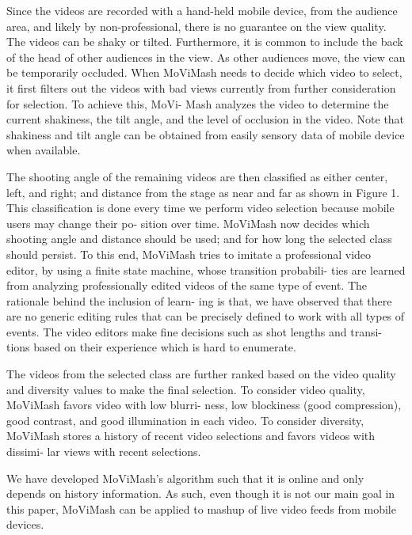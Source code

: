 \documentclass{new}
\begin{document}
Since the videos are recorded with a hand-held mobile device,
from the audience area, and likely by non-professional, there is no
guarantee on the view quality. The videos can be shaky or tilted.
Furthermore, it is common to include the back of the head of other
audiences in the view. As other audiences move, the view can be
temporarily occluded. When MoViMash needs to decide which
video to select, it first filters out the videos with bad views currently
from further consideration for selection. To achieve this, MoVi-
Mash analyzes the video to determine the current shakiness, the tilt
angle, and the level of occlusion in the video. Note that shakiness
and tilt angle can be obtained from easily sensory data of mobile
device when available.

The shooting angle of the remaining videos are then classified as
either center, left, and right; and distance from the stage as near and
far as shown in Figure 1. This classification is done every time we
perform video selection because mobile users may change their po-
sition over time. MoViMash now decides which shooting angle and
distance should be used; and for how long the selected class should
persist. To this end, MoViMash tries to imitate a professional video
editor, by using a finite state machine, whose transition probabili-
ties are learned from analyzing professionally edited videos of the
same type of event. The rationale behind the inclusion of learn-
ing is that, we have observed that there are no generic editing rules
that can be precisely defined to work with all types of events. The
video editors make fine decisions such as shot lengths and transi-
tions based on their experience which is hard to enumerate.

The videos from the selected class are further ranked based on
the video quality and diversity values to make the final selection.
To consider video quality, MoViMash favors video with low blurri-
ness, low blockiness (good compression), good contrast, and good
illumination in each video. To consider diversity, MoViMash stores
a history of recent video selections and favors videos with dissimi-
lar views with recent selections.

We have developed MoViMash’s algorithm such that it is online
and only depends on history information. As such, even though
it is not our main goal in this paper, MoViMash can be applied to
mashup of live video feeds from mobile devices.
\end{document}
